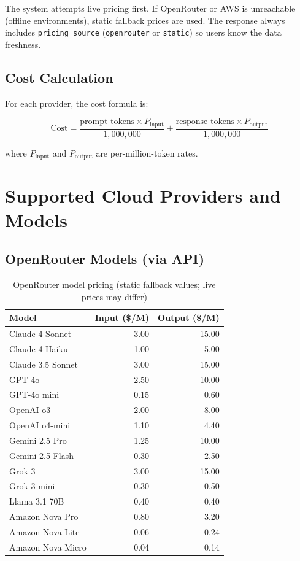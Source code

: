 \documentclass[11pt,a4paper]{article}
\begin{document}
The system attempts live pricing first. If OpenRouter or AWS is unreachable (offline environments), static fallback prices are used. The response always includes \texttt{pricing\_source} (\texttt{openrouter} or \texttt{static}) so users know the data freshness.

\subsection{Cost Calculation}

For each provider, the cost formula is:

\[
\text{Cost} = \frac{\text{prompt\_tokens} \times P_{\text{input}}}{1{,}000{,}000} + \frac{\text{response\_tokens} \times P_{\text{output}}}{1{,}000{,}000}
\]

where $P_{\text{input}}$ and $P_{\text{output}}$ are per-million-token rates.

\section{Supported Cloud Providers and Models}

\subsection{OpenRouter Models (via API)}

\begin{table}[H]
\centering
\begin{tabular}{lrr}
\toprule
\textbf{Model} & \textbf{Input (\$/M)} & \textbf{Output (\$/M)} \\
\midrule
Claude 4 Sonnet & 3.00 & 15.00 \\
Claude 4 Haiku & 1.00 & 5.00 \\
Claude 3.5 Sonnet & 3.00 & 15.00 \\
GPT-4o & 2.50 & 10.00 \\
GPT-4o mini & 0.15 & 0.60 \\
OpenAI o3 & 2.00 & 8.00 \\
OpenAI o4-mini & 1.10 & 4.40 \\
Gemini 2.5 Pro & 1.25 & 10.00 \\
Gemini 2.5 Flash & 0.30 & 2.50 \\
Grok 3 & 3.00 & 15.00 \\
Grok 3 mini & 0.30 & 0.50 \\
Llama 3.1 70B & 0.40 & 0.40 \\
Amazon Nova Pro & 0.80 & 3.20 \\
Amazon Nova Lite & 0.06 & 0.24 \\
Amazon Nova Micro & 0.04 & 0.14 \\
\bottomrule
\end{tabular}
\caption{OpenRouter model pricing (static fallback values; live prices may differ)}
\end{table}
\end{document}
